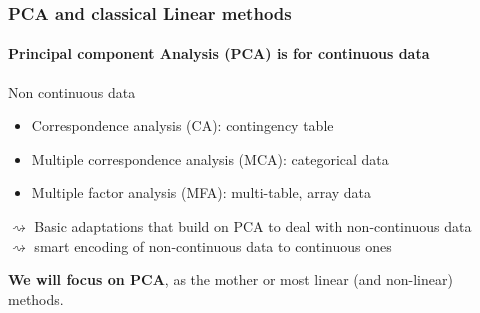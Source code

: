\documentclass{beamer}\usepackage[]{graphicx}\usepackage[]{color}
\begin{document}
\begin{frame}
  \frametitle{PCA and classical Linear methods}
  
  \paragraph{\bf Principal component Analysis (PCA) is for continuous data}

  \begin{block}{Non continuous data}
  \begin{itemize}
    \item Correspondence analysis (CA): contingency table \medskip
    \item Multiple correspondence analysis (MCA): categorical data \medskip
    \item Multiple factor analysis (MFA): multi-table, array data 
  \end{itemize}
  $\rightsquigarrow$ Basic \alert{adaptations that build on PCA} to deal with non-continuous data\\
  $\rightsquigarrow$ smart encoding of non-continuous data to continuous ones
  \end{block}

  \vfill
  
  \begin{center}
    \alert{\bf We will focus on PCA}, as the mother or most linear (and non-linear) methods.
  \end{center}
  
\end{frame}
\end{document}
